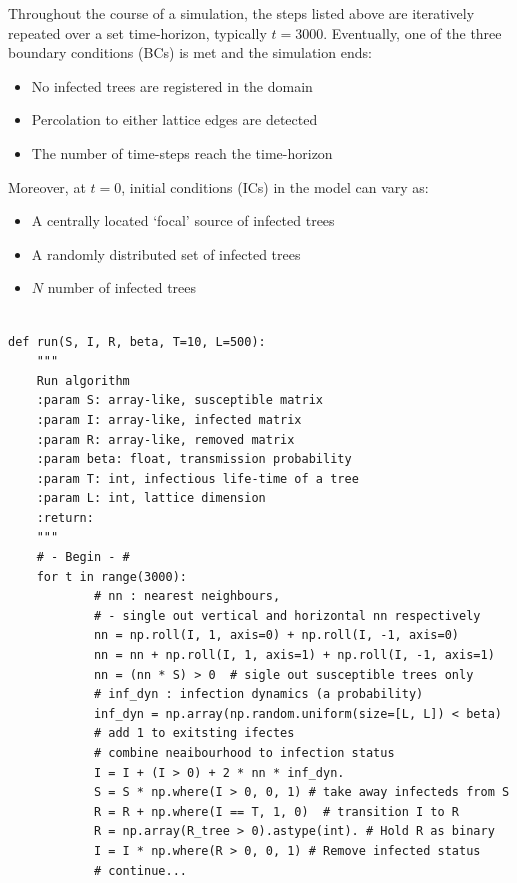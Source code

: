 Throughout the course of a simulation, the steps listed above are iteratively repeated over a set time-horizon, typically $t=3000$.
Eventually, one of the three boundary conditions (BCs) is met and the simulation ends:
\begin{itemize}
    \item No infected trees are registered in the domain
    \item Percolation to either lattice edges are detected
    \item The number of time-steps reach the time-horizon 
\end{itemize}
Moreover, at $t=0$, initial conditions (ICs) in the model can vary as:
\begin{itemize}
    \item A centrally located `focal' source of infected trees
    \item A randomly distributed set of infected trees
    \item $N$ number of infected trees
\end{itemize}

\begin{lstlisting}[style=pythoncode,
    caption = An algorithm written in Python to compute matrix equations and simulate disease spread. 
    A GitHub repository contains all the computer code used to generate Chapters \ref{chapter:SLM} and \ref{chapter:SLM-applications}:
    \nolinkurl{https://github.com/John-Holden/percolation_tree_model.git},
    label = py:rand]

def run(S, I, R, beta, T=10, L=500):
    """
    Run algorithm
    :param S: array-like, susceptible matrix
    :param I: array-like, infected matrix
    :param R: array-like, removed matrix
    :param beta: float, transmission probability
    :param T: int, infectious life-time of a tree
    :param L: int, lattice dimension
    :return:
    """
    # - Begin - #
    for t in range(3000):
            # nn : nearest neighbours, 
            # - single out vertical and horizontal nn respectively
            nn = np.roll(I, 1, axis=0) + np.roll(I, -1, axis=0)
            nn = nn + np.roll(I, 1, axis=1) + np.roll(I, -1, axis=1)
            nn = (nn * S) > 0  # sigle out susceptible trees only
            # inf_dyn : infection dynamics (a probability)
            inf_dyn = np.array(np.random.uniform(size=[L, L]) < beta)
            # add 1 to exitsting ifectes 
            # combine neaibourhood to infection status
            I = I + (I > 0) + 2 * nn * inf_dyn. 
            S = S * np.where(I > 0, 0, 1) # take away infecteds from S
            R = R + np.where(I == T, 1, 0)  # transition I to R
            R = np.array(R_tree > 0).astype(int). # Hold R as binary
            I = I * np.where(R > 0, 0, 1) # Remove infected status 
            # continue...
\end{lstlisting}


